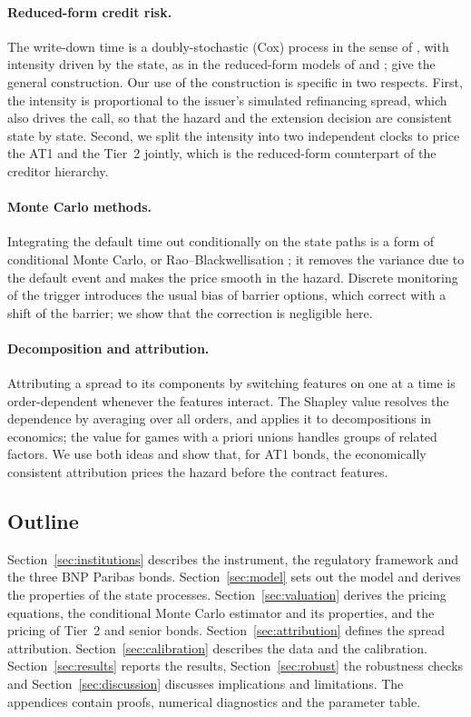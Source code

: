 \paragraph{Reduced-form credit risk.} The write-down time is a doubly-stochastic
(Cox) process in the sense of \citet{Lando1998}, with intensity driven by the state, as
in the reduced-form models of \citet{JarrowTurnbull1995} and \citet{DuffieSingleton1999};
\citet{BieleckiRutkowski2002} give the general construction. Our use of the
construction is specific in two respects. First, the intensity is proportional to the
issuer's simulated refinancing spread, which also drives the call, so that the hazard
and the extension decision are consistent state by state. Second, we split the
intensity into two independent clocks to price the AT1 and the Tier~2 jointly, which
is the reduced-form counterpart of the creditor hierarchy.

\paragraph{Monte Carlo methods.} Integrating the default time out conditionally on the
state paths is a form of conditional Monte Carlo, or Rao--Blackwellisation
\citep{Glasserman2004}; it removes the variance due to the default event and makes the
price smooth in the hazard. Discrete monitoring of the trigger introduces the usual
bias of barrier options, which \citet{BroadieGlassermanKou1997} correct with a shift of
the barrier; we show that the correction is negligible here.

\paragraph{Decomposition and attribution.} Attributing a spread to its components by
switching features on one at a time is order-dependent whenever the features interact.
The Shapley value \citep{Shapley1953} resolves the dependence by averaging over all
orders, and \citet{Shorrocks2013} applies it to decompositions in economics; the value
for games with a priori unions \citep{Owen1977} handles groups of related factors. We
use both ideas and show that, for AT1 bonds, the economically consistent attribution
prices the hazard before the contract features.

\subsection{Outline}

Section~\ref{sec:institutions} describes the instrument, the regulatory framework and
the three BNP Paribas bonds. Section~\ref{sec:model} sets out the model and derives
the properties of the state processes. Section~\ref{sec:valuation} derives the pricing
equations, the conditional Monte Carlo estimator and its properties, and the pricing of
Tier~2 and senior bonds. Section~\ref{sec:attribution} defines the spread attribution.
Section~\ref{sec:calibration} describes the data and the calibration.
Section~\ref{sec:results} reports the results, Section~\ref{sec:robust} the robustness
checks and Section~\ref{sec:discussion} discusses implications and limitations. The
appendices contain proofs, numerical diagnostics and the parameter table.